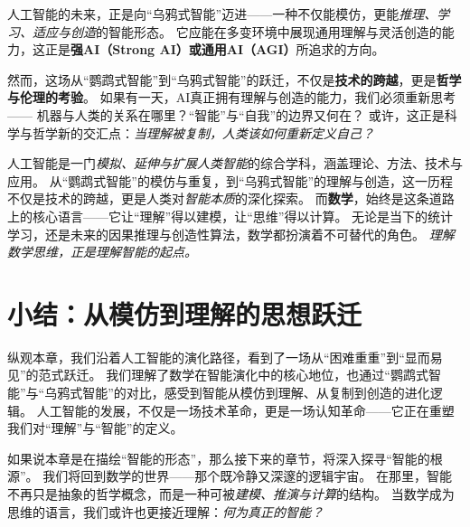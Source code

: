 人工智能的未来，正是向“乌鸦式智能”迈进——一种不仅能模仿，更能\emph{推理、学习、适应与创造}的智能形态。  
它应能在多变环境中展现通用理解与灵活创造的能力，这正是\textbf{强AI（Strong AI）或通用AI（AGI）}所追求的方向。  


然而，这场从“鹦鹉式智能”到“乌鸦式智能”的跃迁，不仅是\textbf{技术的跨越}，更是\textbf{哲学与伦理的考验}。  如果有一天，AI真正拥有理解与创造的能力，我们必须重新思考——  
机器与人类的关系在哪里？“智能”与“自我”的边界又何在？  
或许，这正是科学与哲学新的交汇点：\emph{当理解被复制，人类该如何重新定义自己？}  


人工智能是一门\emph{模拟、延伸与扩展人类智能}的综合学科，涵盖理论、方法、技术与应用。  
从“鹦鹉式智能”的模仿与重复，到“乌鸦式智能”的理解与创造，这一历程不仅是技术的跨越，更是人类对\emph{智能本质}的深化探索。  
而\textbf{数学}，始终是这条道路上的核心语言——它让“理解”得以建模，让“思维”得以计算。  
无论是当下的统计学习，还是未来的因果推理与创造性算法，数学都扮演着不可替代的角色。  
\emph{理解数学思维，正是理解智能的起点。}  


\section{小结：从模仿到理解的思想跃迁}

纵观本章，我们沿着人工智能的演化路径，看到了一场从“困难重重”到“显而易见”的范式跃迁。  
我们理解了数学在智能演化中的核心地位，也通过“鹦鹉式智能”与“乌鸦式智能”的对比，感受到智能从模仿到理解、从复制到创造的进化逻辑。  
人工智能的发展，不仅是一场技术革命，更是一场认知革命——它正在重塑我们对“理解”与“智能”的定义。  

如果说本章是在描绘“智能的形态”，那么接下来的章节，将深入探寻“智能的根源”。  
我们将回到数学的世界——那个既冷静又深邃的逻辑宇宙。  
在那里，智能不再只是抽象的哲学概念，而是一种可被\emph{建模、推演与计算}的结构。  
当数学成为思维的语言，我们或许也更接近理解：\emph{何为真正的智能？}  


\nocite{*}
\newpage